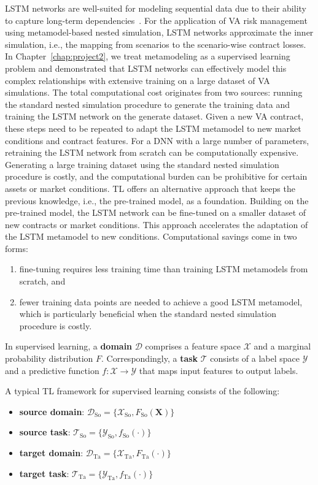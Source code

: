 LSTM networks are well-suited for modeling sequential data due to their ability to capture long-term dependencies~\citep{hochreiter1997long}.
For the application of VA risk management using metamodel-based nested simulation, LSTM networks approximate the inner simulation, i.e., the mapping from scenarios to the scenario-wise contract losses.
In Chapter~\ref{chap:project2}, we treat metamodeling as a supervised learning problem and demonstrated that LSTM networks can effectively model this complex relationships with extensive training on a large dataset of VA simulations.
The total computational cost originates from two sources: running the standard nested simulation procedure to generate the training data and training the LSTM network on the generate dataset.
Given a new VA contract, these steps need to be repeated to adapt the LSTM metamodel to new market conditions and contract features.
For a DNN with a large number of parameters, retraining the LSTM network from scratch can be computationally expensive.
Generating a large training dataset using the standard nested simulation procedure is costly, and the computational burden can be prohibitive for certain assets or market conditions.
TL offers an alternative approach that keeps the previous knowledge, i.e., the pre-trained model, as a foundation.
Building on the pre-trained model, the LSTM network can be fine-tuned on a smaller dataset of new contracts or market conditions.
This approach accelerates the adaptation of the LSTM metamodel to new conditions.
Computational savings come in two forms: 
\begin{enumerate}
    \item   fine-tuning requires less training time than training LSTM metamodels from scratch, and
    \item   fewer training data points are needed to achieve a good LSTM metamodel, which is particularly beneficial when the standard nested simulation procedure is costly.
\end{enumerate}

In supervised learning, a \textbf{domain} $\mathcal{D}$ comprises a feature space $\mathcal{X}$ and a marginal probability distribution $F$. Correspondingly, a \textbf{task} $\mathcal{T}$ consists of a label space $\mathcal{Y}$ and a predictive function $f: \mathcal{X} \rightarrow \mathcal{Y}$ that maps input features to output labels.

A typical TL framework for supervised learning consists of the following:
\begin{itemize}
    \item   \textbf{source domain}: $\mathcal{D}_{\text{So}} = \{\mathcal{X}_{\text{So}}, F_{\text{So}}(\mathbf{X})\}$
    \item   \textbf{source task}: $\mathcal{T}_{\text{So}} = \{\mathcal{Y}_{\text{So}}, f_{\text{So}}(\cdot)\}$
    \item   \textbf{target domain}: $\mathcal{D}_{\text{Ta}} = \{\mathcal{X}_{\text{Ta}}, F_{\text{Ta}}(\cdot)\}$
    \item   \textbf{target task}: $\mathcal{T}_{\text{Ta}} = \{\mathcal{Y}_{\text{Ta}}, f_{\text{Ta}}(\cdot)\}$
\end{itemize}

